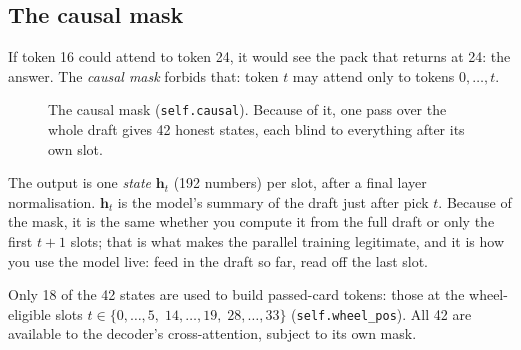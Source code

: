 \documentclass[11pt,letterpaper]{article}
\newcommand{\code}[1]{\texttt{\small #1}}
\begin{document}
\subsection{The causal mask}

If token 16 could attend to token 24, it would see the pack that returns at 24: the answer. The \emph{causal
mask} forbids that: token $t$ may attend only to tokens $0,\dots,t$.

\begin{figure}[!htbp]
\centering
{}
\caption{The causal mask (\code{self.causal}). Because of it, one pass over the whole draft gives 42 honest
states, each blind to everything after its own slot.}
\label{fig:mask}
\end{figure}

The output is one \emph{state} $\mathbf{h}_t$ (192 numbers) per slot, after a final layer normalisation.
$\mathbf{h}_t$ is the model's summary of the draft just after pick $t$. Because of the mask, it is the same
whether you compute it from the full draft or only the first $t+1$ slots; that is what makes the parallel
training legitimate, and it is how you use the model live: feed in the draft so far, read off the last
slot.

Only 18 of the 42 states are used to build passed-card tokens: those at the wheel-eligible slots
$t \in \{0,\dots,5,\;14,\dots,19,\;28,\dots,33\}$ (\code{self.wheel\_pos}). All 42 are available to the
decoder's cross-attention, subject to its own mask.
\end{document}
